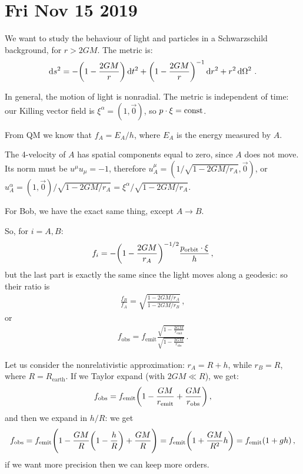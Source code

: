 \documentclass[main.tex]{subfiles}
\begin{document}
\section*{Fri Nov 15 2019}

We want to study the behaviour of light and particles in a Schwarzschild background, for \(r > 2 GM\). The metric is: 
%
\begin{align}
  \dd{s^2} = - \qty(1 - \frac{2GM}{r}) \dd{t^2} 
  + \qty(1 - \frac{2GM}{r})^{-1} \dd{r^2}
  + r^2 \dd{\Omega^2}
\,.
\end{align}

In general, the motion of light is nonradial.
The metric is independent of time: our Killing vector field is \(\xi^{\alpha } = (1, \vec{0} )\), so \(p \cdot \xi = \text{const}\).

From QM we know that \(f_A = E_A / h\), where \(E_A\) is the energy measured by \(A\).

The 4-velocity of \(A\) has spatial components equal to zero, since \(A\) does not move.
Its norm must be  \(u^{\mu } u_{\mu } = -1\), therefore \(u^{\mu }_A = (1/ \sqrt{1 - 2GM / r_A}, \vec{0})\), or \(u^{\alpha}_A = (1, \vec{0}) / \sqrt{1 - 2GM / r_A} = \xi^{\alpha } / \sqrt{1 - 2GM/r_A}\).

For Bob, we have the exact same thing, except \(A \rightarrow B\).

So, for \(i = A, B\): 
%
\begin{align}
  f_i = - \qty(1 - \frac{2GM}{r_A})^{-1/2} \frac{p _{\text{orbit}} \cdot \xi }{h}
\,,
\end{align}
%
but the last part is exactly the same since the light moves along a geodesic: so their ratio is 
%
\begin{align}
  \frac{f_B}{f_A} = \sqrt{\frac{1-2GM /r_A}{1-2GM/r_B}}
\,,
\end{align}
%
or 
%
\begin{align}
  f _{\text{obs}} = f _{\text{emit}} \frac{\sqrt{1 - \frac{2GM}{r _{\text{emit}}}}}{\sqrt{1 - \frac{2GM}{r _{\text{obs}}}}}
\,.
\end{align}

Let us consider the nonrelativistic approximation: \(r_A = R + h\), while \(r_B = R\), where \(R = R _{\text{earth}}\).
If we Taylor expand (with \(2GM \ll R\)), we get: 
%
\begin{align}
  f _{\text{obs}} = f _{\text{emit}} \qty(1 - \frac{GM}{r _{\text{emit}}} + \frac{GM}{r _{\text{obs}}})
\,,
\end{align}
%
and then we expand in \(h/R\): we get 
%
\begin{align}
    f _{\text{obs}} = f _{\text{emit}} \qty(1 - \frac{GM}{R} \qty(1 - \frac{h}{R}) + \frac{GM}{R}) 
    = f _{\text{emit}} \qty(1 + \frac{GM}{R^2} h)
    = f _{\text{emit}} \qty(1 + g h)
  \,,
\end{align}
%
if we want more precision then we can keep more orders.
\end{document}
